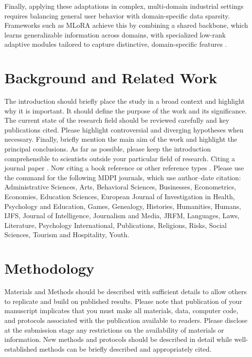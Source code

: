 \documentclass[journal,article,submit,pdftex,moreauthors]{Definitions/mdpi}
\begin{document}
Finally, applying these adaptations in complex, multi-domain industrial settings requires balancing general user behavior with domain-specific data sparsity. Frameworks such as MLoRA achieve this by combining a shared backbone, which learns generalizable information across domains, with specialized low-rank adaptive modules tailored to capture distinctive, domain-specific features \citep{yang2024mlora}.



\section{Background and Related Work}

The introduction should briefly place the study in a broad context and highlight why it is important. It should define the purpose of the work and its significance. The current state of the research field should be reviewed carefully and key publications cited. Please highlight controversial and diverging hypotheses when necessary. Finally, briefly mention the main aim of the work and highlight the principal conclusions. As far as possible, please keep the introduction comprehensible to scientists outside your particular field of research. Citing a journal paper \citep{ref-journal}.  Now citing a book reference \citep{ref-book1,ref-book2} or other reference types \citep{ref-unpublish,ref-url}. Please use the command \citep{ref-proceeding,ref-thesis} for the following MDPI journals, which use author--date citation: Administrative Sciences, Arts, Behavioral Sciences, Businesses, Econometrics, Economies, Education Sciences, European Journal of Investigation in Health, Psychology and Education, Games, Genealogy, Histories, Humanities, Humans, IJFS, Journal of Intelligence, Journalism and Media, JRFM, Languages, Laws, Literature, Psychology International, Publications, Religions, Risks, Social Sciences, Tourism and Hospitality, Youth. 

\section{Methodology}

Materials and Methods should be described with sufficient details to allow others to replicate and build on published results. Please note that publication of your manuscript implicates that you must make all materials, data, computer code, and protocols associated with the publication available to readers. Please disclose at the submission stage any restrictions on the availability of materials or information. New methods and protocols should be described in detail while well-established methods can be briefly described and appropriately cited.
\end{document}
